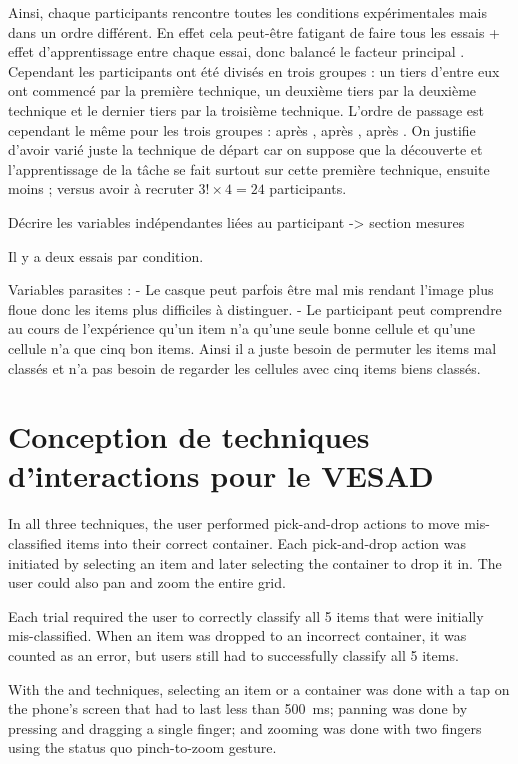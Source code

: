 Ainsi, chaque participants rencontre toutes les conditions expérimentales mais dans un ordre différent. En effet cela peut-être fatigant de faire tous les essais + effet d'apprentissage entre chaque essai, donc balancé le facteur principal . Cependant les participants ont été divisés en trois groupes : un tiers d'entre eux ont commencé par la première technique, un deuxième tiers par la deuxième technique et le dernier tiers par la troisième technique. L'ordre de passage est cependant le même pour les trois groupes :  après ,  après ,  après . On justifie d'avoir varié juste la technique de départ car on suppose que la découverte et l'apprentissage de la tâche se fait surtout sur cette première technique, ensuite moins ; versus avoir à recruter $3! \times 4 = 24$ participants.

Décrire les variables indépendantes liées au participant -> section mesures

Il y a deux essais par condition.

Variables parasites : 
- Le casque peut parfois être mal mis rendant l'image plus floue donc les items plus difficiles à distinguer.
- Le participant peut comprendre au cours de l'expérience qu'un item n'a qu'une seule bonne cellule et qu'une cellule n'a que cinq bon items. Ainsi il a juste besoin de permuter les items mal classés et n'a pas besoin de regarder les cellules avec cinq items biens classés.


\section{Conception de techniques d'interactions pour le VESAD}
\label{sec:experiment_interaction_techniques}

In all three techniques, the user performed pick-and-drop actions to move mis-classified items into their correct container. Each pick-and-drop action was initiated by selecting an item and later selecting the container to drop it in. The user could also pan and zoom the entire grid.

Each trial required the user to correctly classify all 5 items that were initially mis-classified. When an item was dropped to an incorrect container, it was counted as an error, but users still had to successfully classify all 5 items.

With the  and  techniques, selecting an item or a container was done with a tap on the phone's screen that had to last less than \SI{500}{\ms}; panning was done by pressing and dragging a single finger; and zooming was done with two fingers using the status quo pinch-to-zoom gesture.

